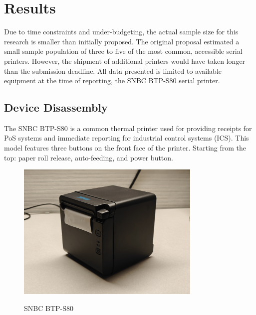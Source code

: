 \section*{Results}

Due to time constraints and under-budgeting, the actual sample size for this research is smaller than initially proposed. The original proposal estimated a small sample population of three to five of the most common, accessible serial printers. However, the shipment of additional printers would have taken longer than the submission deadline. All data presented is limited to available equipment at the time of reporting, the SNBC BTP-S80 serial printer.

\subsection{Device Disassembly} \label{devicedisassembly}




The SNBC BTP-S80 is a common thermal printer used for providing receipts for PoS systems and immediate reporting for industrial control systems (ICS). This model features three buttons on the front face of the printer. Starting from the top: paper roll release, auto-feeding, and power button.  

\begin{figure}[ht]
    \centering
    {\includegraphics[width=88mm,scale=0.5]
    {Figures/Teardown/IMG20231204170511.jpg}}
    \caption{SNBC BTP-S80}
    \label{fig:snbc_btp_s80}
\end{figure}

